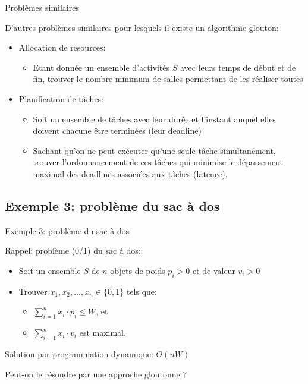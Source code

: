 \begin{frame}{Problèmes similaires}

D'autres problèmes similaires pour lesquels il existe un algorithme glouton:
\begin{itemize}
\item Allocation de resources:
\begin{itemize}
\item Etant donnée un ensemble d'activités $S$ avec leurs temps de début et de fin, trouver le nombre minimum de salles permettant de les réaliser toutes
\end{itemize}

\bigskip

\item Planification de tâches:
\begin{itemize}
\item Soit un ensemble de tâches avec leur durée et l'instant auquel elles doivent chacune être terminées (leur deadline)
\item Sachant qu'on ne peut exécuter qu'une seule tâche simultanément,
  trouver l'ordonnancement de ces tâches qui minimise le dépassement maximal des deadlines associées aux tâches (latence).
\end{itemize}
\end{itemize}


\end{frame}

\subsection{Exemple 3: problème du sac à dos}

\begin{frame}{Exemple 3: problème du sac à dos}

Rappel: problème (0/1) du sac à dos:
\begin{itemize}
\item Soit un ensemble $S$ de $n$ objets de poids $p_i>0$ et de valeur $v_i>0$
\item Trouver $x_1, x_2, \ldots, x_n \in \{0,1\}$ tels que:
\begin{itemize}
\item $\sum_{i=1}^n x_i\cdot p_i\leq W$, et
\item $\sum_{i=1}^n x_i\cdot v_i$ est maximal.
\end{itemize}
\end{itemize}

\bigskip

Solution par programmation dynamique: $\Theta(n W)$

\bigskip

Peut-on le résoudre par une approche gloutonne ?



\end{frame}


